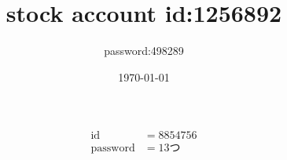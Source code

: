 \documentclass{article}
\title{stock account id:1256892}
\author{password:498289}
\date{\today}
\begin{document}
    \[
        \begin{split}
            \mathrm{id}&=8854756\\
            \mathrm{password}&=13つ
        \end{split}
    \]
\end{document}
